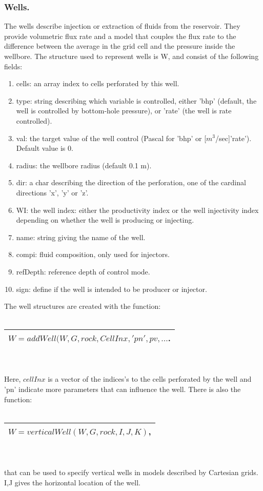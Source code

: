 \documentclass[a4paper,10pt]{report}
\begin{document}
\subsubsection{Wells.}
The wells describe injection or extraction of fluids from the reservoir. They provide volumetric
flux rate and a model that couples the flux rate to the difference between the average in the grid cell
and the pressure inside the wellbore. The structure used to represent wells is W, and consist of 
the following fields:
\begin{enumerate}
\item cells: an array index to cells perforated by this well.
\item type: string describing which variable is controlled, either ’bhp’ (default, the well is controlled by bottom-hole pressure), or ’rate’ (the well is rate controlled).
\item val: the target value of the well control (Pascal for ’bhp’ or [$m^3$/sec]’rate’). Default value is 0.
\item radius: the wellbore radius (default 0.1 m).
\item dir: a char describing the direction of the perforation, one of the cardinal
directions ’x’, ’y’ or ’z’.
\item WI: the well index: either the productivity index or the well injectivity index
depending on whether the well is producing or injecting.
\item name: string giving the name of the well.
\item compi: fluid composition, only used for injectors.
\item refDepth: reference depth of control mode.
\item sign: define if the well is intended to be producer or injector.
\end{enumerate}
The well structures are created with the function:\\\\
\begin{tabular}{|l|}
\hline
 $W=addWell(W,G,rock,CellInx, 'pn', pv,...$.\\
\hline
\end{tabular}
\\\\Here, $cellInx$ is a vector of the indices's to the cells perforated by the well and 'pn' indicate more 
parameters that can influence the well. 
There is also the function:\\\\
\begin{tabular}{|l|}
\hline
 $W=verticalWell(W,G,rock,I,J,K)$,\\
\hline
\end{tabular}
\\\\that can be used to specify vertical wells in models described by Cartesian
grids. I,J gives the horizontal location of the well.
\end{document}

